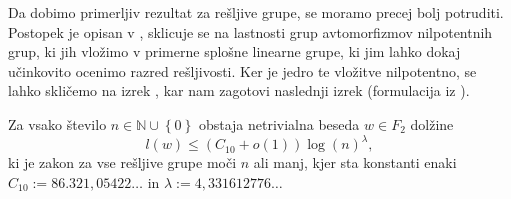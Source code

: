 Da dobimo primerljiv rezultat za rešljive grupe, se moramo precej bolj potruditi. Postopek je opisan v \cite[str.~3--4]{Thom_2015}, sklicuje se na lastnosti grup avtomorfizmov nilpotentnih grup, ki jih vložimo
v primerne splošne linearne grupe, ki jim lahko dokaj učinkovito ocenimo razred rešljivosti. Ker je jedro te vložitve nilpotentno, se lahko skličemo na izrek \cite{trd_koncna_ugotovitev_nilpotentne_v_nalogi}, kar nam zagotovi naslednji izrek (formulacija iz \cite[str.~25]{Schneider_2016}).  

\begin{izrek}
\label{izr_glavni_izrek_resljive}
 Za vsako število $n \in  \mathbb{N} \cup  \left\{ 0\right\}$ obstaja netrivialna beseda $w \in F_2$ dolžine \begin{equation*}
 l(w) \le (C_{10} + o(1)) \log(n)^{\lambda},
 \end{equation*}  
   ki je zakon za vse rešljive grupe moči $n$ ali manj, kjer sta konstanti enaki $C_{10} := 86.321{,}05422 \ldots$ in $\lambda := 4{,}331612776 \ldots$ 
\end{izrek}

